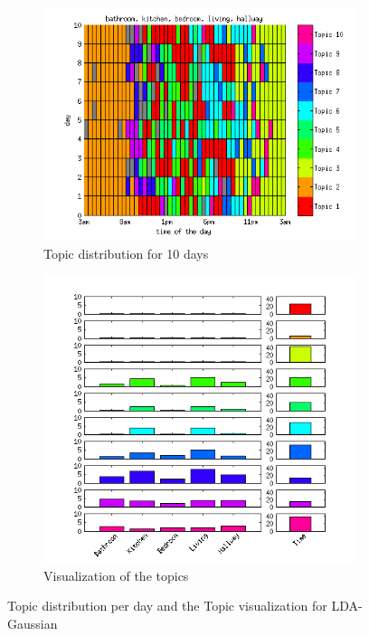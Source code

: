 \documentclass[11pt,a4paper]{article}
\begin{document}
\begin{figure}[h!]
 \centering
 \begin{subfigure}[b]{0.45\linewidth}
  \centering
  \includegraphics[width=\textwidth]{Pictures/PoisDayHN2TS48k20.png}
  \caption{Topic distribution for 10 days}
 \end{subfigure}
 \begin{subfigure}[b]{0.45\linewidth}
  \centering
  \includegraphics[width=\textwidth]{Pictures/PoisTopHN2TS48k20.png}
  \caption{Visualization of the topics}
  \label{fig:PoisTopVisu48}
 \end{subfigure}
 \caption{Topic distribution per day and the Topic visualization for LDA-Gaussian}
 \label{fig:Pois48}
\end{figure}
\end{document}
